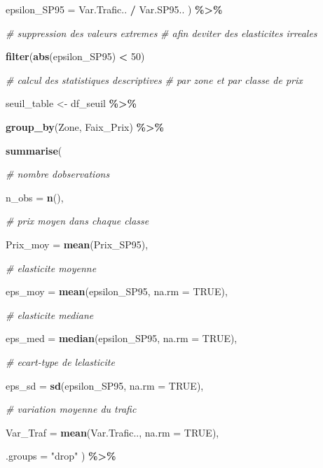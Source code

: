 \documentclass[
]{article}
\newenvironment{Shaded}{\begin{snugshade}}{\end{snugshade}}
\newcommand{\AttributeTok}[1]{\textcolor[rgb]{0.13,0.29,0.53}{#1}}
\newcommand{\CommentTok}[1]{\textcolor[rgb]{0.56,0.35,0.01}{\textit{#1}}}
\newcommand{\ConstantTok}[1]{\textcolor[rgb]{0.56,0.35,0.01}{#1}}
\newcommand{\DecValTok}[1]{\textcolor[rgb]{0.00,0.00,0.81}{#1}}
\newcommand{\FunctionTok}[1]{\textcolor[rgb]{0.13,0.29,0.53}{\textbf{#1}}}
\newcommand{\NormalTok}[1]{#1}
\newcommand{\OtherTok}[1]{\textcolor[rgb]{0.56,0.35,0.01}{#1}}
\newcommand{\SpecialCharTok}[1]{\textcolor[rgb]{0.81,0.36,0.00}{\textbf{#1}}}
\newcommand{\StringTok}[1]{\textcolor[rgb]{0.31,0.60,0.02}{#1}}
\begin{document}
\begin{Shaded}
\begin{Highlighting}[]
    \AttributeTok{epsilon\_SP95 =}\NormalTok{ Var.Trafic.. }\SpecialCharTok{/}\NormalTok{ Var.SP95..}
\NormalTok{  ) }\SpecialCharTok{\%\textgreater{}\%}

  \CommentTok{\# suppression des valeurs extremes}
  \CommentTok{\# afin d\textquotesingle{}eviter des elasticites irreales}

  \FunctionTok{filter}\NormalTok{(}\FunctionTok{abs}\NormalTok{(epsilon\_SP95) }\SpecialCharTok{\textless{}} \DecValTok{50}\NormalTok{)}


\CommentTok{\# calcul des statistiques descriptives}
\CommentTok{\# par zone et par classe de prix}

\NormalTok{seuil\_table }\OtherTok{\textless{}{-}}\NormalTok{ df\_seuil }\SpecialCharTok{\%\textgreater{}\%}

  \FunctionTok{group\_by}\NormalTok{(Zone, Faix\_Prix) }\SpecialCharTok{\%\textgreater{}\%}

  \FunctionTok{summarise}\NormalTok{(}

    \CommentTok{\# nombre d\textquotesingle{}observations}

    \AttributeTok{n\_obs =} \FunctionTok{n}\NormalTok{(),}

    \CommentTok{\# prix moyen dans chaque classe}

    \AttributeTok{Prix\_moy =} \FunctionTok{mean}\NormalTok{(Prix\_SP95),}

    \CommentTok{\# elasticite moyenne}

    \AttributeTok{eps\_moy =} \FunctionTok{mean}\NormalTok{(epsilon\_SP95, }\AttributeTok{na.rm =} \ConstantTok{TRUE}\NormalTok{),}

    \CommentTok{\# elasticite mediane}

    \AttributeTok{eps\_med =} \FunctionTok{median}\NormalTok{(epsilon\_SP95, }\AttributeTok{na.rm =} \ConstantTok{TRUE}\NormalTok{),}

    \CommentTok{\# ecart{-}type de l\textquotesingle{}elasticite}

    \AttributeTok{eps\_sd =} \FunctionTok{sd}\NormalTok{(epsilon\_SP95, }\AttributeTok{na.rm =} \ConstantTok{TRUE}\NormalTok{),}

    \CommentTok{\# variation moyenne du trafic}

    \AttributeTok{Var\_Traf =} \FunctionTok{mean}\NormalTok{(Var.Trafic.., }\AttributeTok{na.rm =} \ConstantTok{TRUE}\NormalTok{),}

    \AttributeTok{.groups =} \StringTok{"drop"}
\NormalTok{  ) }\SpecialCharTok{\%\textgreater{}\%}


\end{Highlighting}
\end{Shaded}
\end{document}
